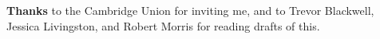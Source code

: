                     \textbf{Thanks} to the Cambridge Union for inviting me, and to
                    Trevor Blackwell, Jessica Livingston, and Robert Morris for
                    reading drafts of this. 


              
            
          
            
              
                


                  
              
            
          
